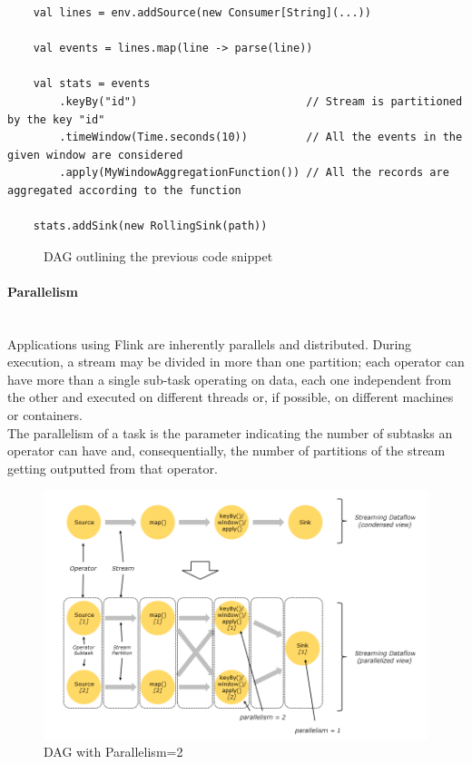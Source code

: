 \pagebreak

\begin{verbatim}
    val lines = env.addSource(new Consumer[String](...))
	
    val events = lines.map(line -> parse(line))
	
    val stats = events
        .keyBy("id")                          // Stream is partitioned by the key "id"
        .timeWindow(Time.seconds(10))         // All the events in the given window are considered
        .apply(MyWindowAggregationFunction()) // All the records are aggregated according to the function
		
    stats.addSink(new RollingSink(path))
\end{verbatim}

\begin{figure}[th]
	\centering
	\def\svgwidth{\columnwidth}
	
	\decoRule
	\caption[Streaming Dataflow]{DAG outlining the previous code snippet}
	\label{fig:Dataflow}
\end{figure}

\pagebreak

\paragraph{Parallelism} \label{ParallelismFlink} ~\\

Applications using Flink are inherently parallels and distributed. During execution, a stream may be divided in more than one partition; each operator can have more than a single sub-task operating on data, each one independent from the other and executed on different threads or, if possible, on different machines or containers.\\
The parallelism of a task is the parameter indicating the number of subtasks an operator can have and, consequentially, the number of partitions of the stream getting outputted from that operator.\\

\begin{figure}
    \centering
    \includegraphics{Figures/parallel_dataflow.png}
    \decoRule
    \caption[Parallel Dataflow]{DAG with Parallelism=2}
    \label{fig:ParallelDataflow}
\end{figure}


